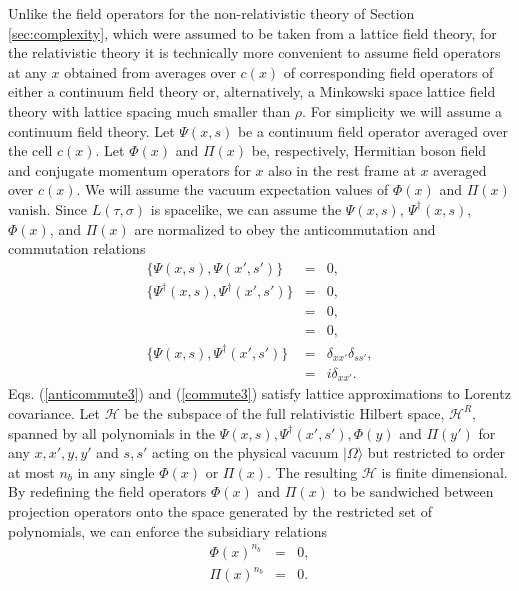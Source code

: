 \documentclass[12pt,amsmath,amssymb,onecolumn]{revtex4-2}
\begin{document}
Unlike the field operators for the non-relativistic theory of Section \ref{sec:complexity},
which were assumed to be taken from a lattice field theory, for the relativistic
theory it is technically more convenient to assume field operators at any $x$ obtained from averages
over $c(x)$ of corresponding field operators of either a continuum field theory
or, alternatively, a Minkowski space lattice field theory with lattice spacing much smaller than $\rho$.
For simplicity we will assume a continuum field theory.
Let $\Psi( x, s)$ be
a
continuum field operator averaged over the cell $c(x)$.
Let $\Phi( x)$ and $\Pi( x)$ be, respectively, Hermitian boson field and
conjugate momentum operators for $x$ also in the rest frame
at $x$ averaged over $c(x)$.
We will assume the vacuum expectation values of $\Phi(x)$ and $\Pi(x)$ vanish.
Since $L(\tau, \sigma)$ is spacelike, we can assume the $\Psi(x,s)$, $\Psi^\dagger(x,s)$,
$\Phi(x)$, and $\Pi(x)$ are normalized to
obey 
the anticommutation and commutation relations
\begin{subequations}
\begin{eqnarray}
\label{anticommute1}
\{ \Psi( x, s), \Psi( x', s') \} & = & 0, \\
\label{anticommute2}
\{ \Psi^\dagger( x, s),\Psi^\dagger( x', s') \} & = & 0,\\
\label{commute1}
[ \Phi( x), \Phi( x')] & = & 0, \\
\label{commute2}
[ \Pi( x), \Pi( x')] & = & 0, \\
\label{anticommute3}
\{\Psi( x, s),\Psi^\dagger( x', s') \} &=& \delta_{xx'} \delta_{ss'}, \\
\label{commute3}
[\Phi( x),\Pi( x') ] & = & i \delta_{xx'}.
\end{eqnarray}
\end{subequations}
Eqs. (\ref{anticommute3}) and (\ref{commute3}) satisfy lattice approximations to Lorentz covariance.
Let $\mathcal{H}$ be the subspace of the full relativistic Hilbert space, $\mathcal{H}^R$,
spanned by all polynomials in
the $\Psi( x, s), \Psi^\dagger( x', s'),\Phi( y)$ and $\Pi( y')$
for any $x, x', y, y'$ and $s, s'$ acting on the physical vacuum $|\Omega \rangle $
but restricted to order at most $n_b$ in any single $\Phi(x)$ or $\Pi(x)$.
The resulting $\mathcal{H}$ is finite dimensional.
By redefining the field operators $\Phi(x)$ and $\Pi(x)$
to be sandwiched between projection operators onto the space generated
by the restricted set of polynomials, we can enforce
the subsidiary relations
\begin{subequations}
  \begin{eqnarray}
    \label{cutoff0}
    \Phi( x)^{n_b} & = & 0, \\
    \label{cutoff1}
    \Pi( x)^{n_b} & = & 0.
  \end{eqnarray}
\end{subequations}
\end{document}
